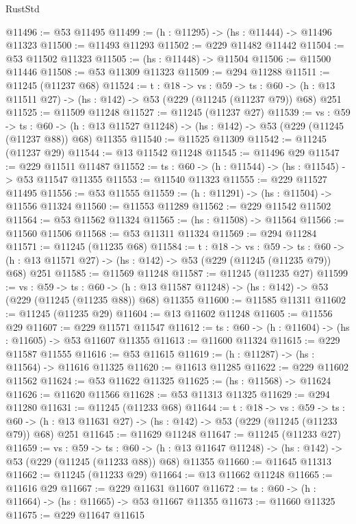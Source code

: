 \begin{lexlean}{RustStd}
\begin{coremodule}
@11496 := @53 @11495
@11499 := (h : @11295) -> (hs : @11444) -> @11496 @11323
@11500 := @11493 @11293
@11502 := @229 @11482 @11442
@11504 := @53 @11502 @11323
@11505 := (hs : @11448) -> @11504
@11506 := @11500 @11446
@11508 := @53 @11309 @11323
@11509 := @294 @11288
@11511 := @11245 (@11237 @68)
@11524 := {t : @18} ->
  {vs : @59} ->
  {ts : @60} -> (h : @13 @11511 @27) -> (hs : @142) -> @53 (@229 (@11245 (@11237 @79)) @68) @251
@11525 := @11509 @11248
@11527 := @11245 (@11237 @27)
@11539 := {vs : @59} ->
  {ts : @60} ->
  (h : @13 @11527 @11248) -> (hs : @142) -> @53 (@229 (@11245 (@11237 @88)) @68) @11355
@11540 := @11525 @11309
@11542 := @11245 (@11237 @29)
@11544 := @13 @11542 @11248
@11545 := @11496 @29
@11547 := @229 @11511 @11487
@11552 := {ts : @60} -> (h : @11544) -> (hs : @11545) -> @53 @11547 @11355
@11553 := @11540 @11323
@11555 := @229 @11527 @11495
@11556 := @53 @11555
@11559 := (h : @11291) -> (hs : @11504) -> @11556 @11324
@11560 := @11553 @11289
@11562 := @229 @11542 @11502
@11564 := @53 @11562 @11324
@11565 := (hs : @11508) -> @11564
@11566 := @11560 @11506
@11568 := @53 @11311 @11324
@11569 := @294 @11284
@11571 := @11245 (@11235 @68)
@11584 := {t : @18} ->
  {vs : @59} ->
  {ts : @60} -> (h : @13 @11571 @27) -> (hs : @142) -> @53 (@229 (@11245 (@11235 @79)) @68) @251
@11585 := @11569 @11248
@11587 := @11245 (@11235 @27)
@11599 := {vs : @59} ->
  {ts : @60} ->
  (h : @13 @11587 @11248) -> (hs : @142) -> @53 (@229 (@11245 (@11235 @88)) @68) @11355
@11600 := @11585 @11311
@11602 := @11245 (@11235 @29)
@11604 := @13 @11602 @11248
@11605 := @11556 @29
@11607 := @229 @11571 @11547
@11612 := {ts : @60} -> (h : @11604) -> (hs : @11605) -> @53 @11607 @11355
@11613 := @11600 @11324
@11615 := @229 @11587 @11555
@11616 := @53 @11615
@11619 := (h : @11287) -> (hs : @11564) -> @11616 @11325
@11620 := @11613 @11285
@11622 := @229 @11602 @11562
@11624 := @53 @11622 @11325
@11625 := (hs : @11568) -> @11624
@11626 := @11620 @11566
@11628 := @53 @11313 @11325
@11629 := @294 @11280
@11631 := @11245 (@11233 @68)
@11644 := {t : @18} ->
  {vs : @59} ->
  {ts : @60} -> (h : @13 @11631 @27) -> (hs : @142) -> @53 (@229 (@11245 (@11233 @79)) @68) @251
@11645 := @11629 @11248
@11647 := @11245 (@11233 @27)
@11659 := {vs : @59} ->
  {ts : @60} ->
  (h : @13 @11647 @11248) -> (hs : @142) -> @53 (@229 (@11245 (@11233 @88)) @68) @11355
@11660 := @11645 @11313
@11662 := @11245 (@11233 @29)
@11664 := @13 @11662 @11248
@11665 := @11616 @29
@11667 := @229 @11631 @11607
@11672 := {ts : @60} -> (h : @11664) -> (hs : @11665) -> @53 @11667 @11355
@11673 := @11660 @11325
@11675 := @229 @11647 @11615

\end{coremodule}
\end{lexlean}
